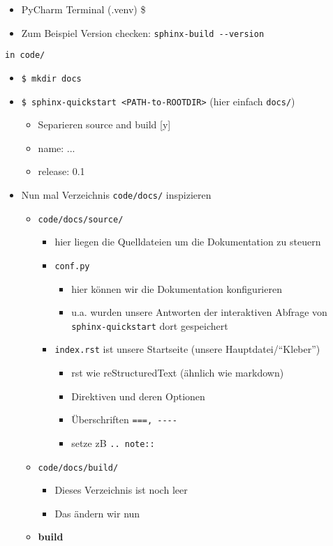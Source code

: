 \begin{itemize}
	\item
	PyCharm Terminal (.venv) \$
	\item
	Zum Beispiel Version checken: \texttt{sphinx-build\ -\/-version}
\end{itemize}
%
\texttt{in \texttt{code/}}
\begin{itemize}
	\item \texttt{\$ mkdir docs}
	\item \texttt{\$ sphinx-quickstart\ \textless{}PATH-to-ROOTDIR\textgreater{}}
	(hier einfach \texttt{docs/})	
	\begin{itemize}	
		\item Separieren source and build [y]
		\item name: ...
		\item release: 0.1
	\end{itemize}
	\item Nun mal	Verzeichnis \texttt{code/docs/} inspizieren	
	\begin{itemize}
		
		\item
		\texttt{code/docs/source/}		
		\begin{itemize}
			
			\item
			hier liegen die Quelldateien um die Dokumentation zu steuern
			\item 
			\texttt{conf.py}
			
			\begin{itemize}
				
				\item
				hier können wir die Dokumentation konfigurieren
				\item
				u.a. wurden unsere Antworten der interaktiven Abfrage von \texttt{sphinx-quickstart} dort gespeichert
			\end{itemize}
			\item
			\texttt{index.rst} ist unsere Startseite (unsere Hauptdatei/``Kleber'')		
			\begin{itemize}
				
				\item
				rst wie reStructuredText (ähnlich wie markdown)
				\item
				Direktiven und deren Optionen
				\item
				Überschriften \texttt{===,\ -\/-\/-\/-}
				\item
				setze zB \texttt{..\ note::}
			\end{itemize}
		\end{itemize}
		\item
		\texttt{code/docs/build/}		
		\begin{itemize}			
			\item Dieses Verzeichnis ist noch leer
			\item Das ändern wir nun
		\end{itemize}
		\item
	\textbf{build}
	

\end{itemize}
\end{itemize}
